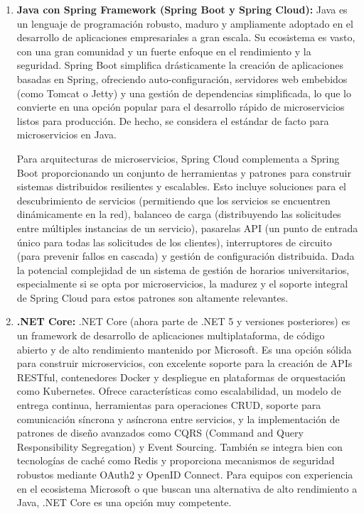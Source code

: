 \begin{enumerate}
    \item \textbf{Java con Spring Framework (Spring Boot y Spring Cloud)\cite{springcloud}:}
    Java es un lenguaje de programación robusto, maduro y ampliamente adoptado en el desarrollo de aplicaciones empresariales a gran escala. Su ecosistema es vasto, con una gran comunidad y un fuerte enfoque en el rendimiento y la seguridad. Spring Boot simplifica drásticamente la creación de aplicaciones basadas en Spring, ofreciendo auto-configuración, servidores web embebidos (como Tomcat o Jetty) y una gestión de dependencias simplificada, lo que lo convierte en una opción popular para el desarrollo rápido de microservicios listos para producción. De hecho, se considera el estándar de facto para microservicios en Java.

    Para arquitecturas de microservicios, Spring Cloud complementa a Spring Boot proporcionando un conjunto de herramientas y patrones para construir sistemas distribuidos resilientes y escalables. Esto incluye soluciones para el descubrimiento de servicios (permitiendo que los servicios se encuentren dinámicamente en la red), balanceo de carga (distribuyendo las solicitudes entre múltiples instancias de un servicio), pasarelas API (un punto de entrada único para todas las solicitudes de los clientes), interruptores de circuito (para prevenir fallos en cascada) y gestión de configuración distribuida. Dada la potencial complejidad de un sistema de gestión de horarios universitarios, especialmente si se opta por microservicios, la madurez y el soporte integral de Spring Cloud para estos patrones son altamente relevantes.

    \item \textbf{.NET Core\cite{dotnetcore}:}
    .NET Core (ahora parte de .NET 5 y versiones posteriores) es un framework de desarrollo de aplicaciones multiplataforma, de código abierto y de alto rendimiento mantenido por Microsoft. Es una opción sólida para construir microservicios, con excelente soporte para la creación de APIs RESTful, contenedores Docker y despliegue en plataformas de orquestación como Kubernetes. Ofrece características como escalabilidad, un modelo de entrega continua, herramientas para operaciones CRUD, soporte para comunicación síncrona y asíncrona entre servicios, y la implementación de patrones de diseño avanzados como CQRS (Command and Query Responsibility Segregation) y Event Sourcing. También se integra bien con tecnologías de caché como Redis y proporciona mecanismos de seguridad robustos mediante OAuth2 y OpenID Connect. Para equipos con experiencia en el ecosistema Microsoft o que buscan una alternativa de alto rendimiento a Java, .NET Core es una opción muy competente.


\end{enumerate}
